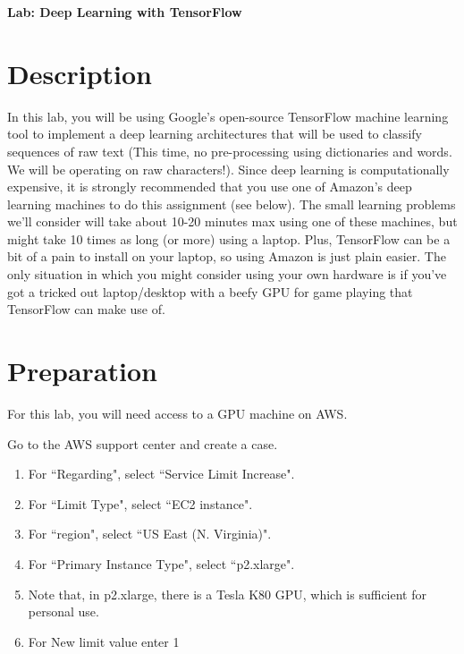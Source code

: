\documentclass[11pt]{article}
\renewcommand\:{\colon} %
\begin{document}

\begin{center}
{\bf \huge{Lab: Deep Learning with TensorFlow}}
\end{center}

\section{Description}

In this lab, you will be using Google's open-source TensorFlow machine learning tool to implement
a deep learning architectures that will be used to classify sequences of raw text (This time, no
pre-processing using dictionaries and words. We will be operating on raw characters!). Since deep learning
is computationally expensive, it is strongly recommended that you use one of Amazon's deep learning machines
to do this assignment (see below). The small learning problems we'll consider will take about 10-20
minutes max using one of these machines, but might take 10 times as long (or more) using a laptop. Plus,
TensorFlow can be a bit of a pain to install on your laptop, so using Amazon is just plain easier. The only
situation in which you might consider using your own hardware is if you've got a tricked out laptop/desktop
with a beefy GPU for game playing that TensorFlow can make use of.

\section{Preparation}

For this lab, you will need access to a GPU machine on AWS. 

Go to the AWS support center and create a case. 

\begin{enumerate}
\item For ``Regarding", select ``Service Limit Increase". 
\item For ``Limit Type", select ``EC2 instance". 
\item For ``region", select ``US East (N. Virginia)". 
\item For ``Primary Instance Type", select ``p2.xlarge". 
\item[] Note that, in p2.xlarge, there is a Tesla K80 GPU, which is sufficient for personal use. 
\item For New limit value enter 1
\end{enumerate}
\end{document}
